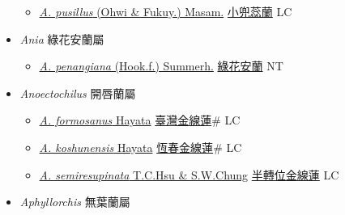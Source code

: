 \begin{itemize}
  \begin{itemize}
        \item[] \href{http://www.theplantlist.org/tpl1.1/search?q=Androcorys+pusillus}{\textit{A. pusillus} (Ohwi \& Fukuy.) Masam.}   \href{\detokenize{http://taibnet.sinica.edu.tw/chi/taibnet_species_list.php?T2=小兜蕊蘭&T2_new_value=true&fr=y}}{小兜蕊蘭} LC
  \end{itemize}
 \item[] \textit{Ania} 綠花安蘭屬
                    
  \begin{itemize}
        \item[] \href{http://www.theplantlist.org/tpl1.1/search?q=Ania+penangiana}{\textit{A. penangiana} (Hook.f.) Summerh.}   \href{\detokenize{http://taibnet.sinica.edu.tw/chi/taibnet_species_list.php?T2=綠花安蘭&T2_new_value=true&fr=y}}{綠花安蘭} NT
  \end{itemize}
 \item[] \textit{Anoectochilus} 開唇蘭屬
                    
  \begin{itemize}
        \item[] \href{http://www.theplantlist.org/tpl1.1/search?q=Anoectochilus+formosanus}{\textit{A. formosanus} Hayata}   \href{\detokenize{http://taibnet.sinica.edu.tw/chi/taibnet_species_list.php?T2=臺灣金線蓮&T2_new_value=true&fr=y}}{臺灣金線蓮}\# LC
        \item[] \href{http://www.theplantlist.org/tpl1.1/search?q=Anoectochilus+koshunensis}{\textit{A. koshunensis} Hayata}   \href{\detokenize{http://taibnet.sinica.edu.tw/chi/taibnet_species_list.php?T2=恆春金線蓮&T2_new_value=true&fr=y}}{恆春金線蓮}\# LC
        \item[] \href{http://www.theplantlist.org/tpl1.1/search?q=Anoectochilus+semiresupinata}{\textit{A. semiresupinata} T.C.Hsu \& S.W.Chung}   \href{\detokenize{http://taibnet.sinica.edu.tw/chi/taibnet_species_list.php?T2=半轉位金線蓮&T2_new_value=true&fr=y}}{半轉位金線蓮} LC
  \end{itemize}
 \item[] \textit{Aphyllorchis} 無葉蘭屬
                    

\end{itemize}

